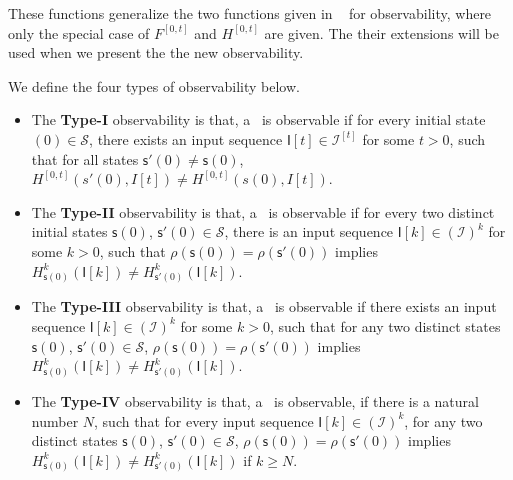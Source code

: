 These functions generalize the two functions given in ~\cite{Zhang2016Observability} for observability,  where only the special case of $F^{[0,t]}$ and $H^{[0,t]}$ are given. The their extensions  will be used when we present the the new observability.
\begin{definition} 
We define the four types of observability below. 
\begin{itemize}
  \item The {\bf Type-I} observability is that, a \BCN\ is observable if for every initial state \State$(0)\in \mathcal{S}$, there exists an input sequence $\mathsf{I}[t]\in\mathcal{I}^{[t]}$ for some $t>0$, such that for all states $\mathsf{s}'(0)\neq \mathsf{s}(0)$,  $H^{[0,t]}(s'(0),I[t])\neq H^{[0,t]}(s(0), I[t])$.
  \item The  {\bf Type-II} observability is that, a \BCN\ is observable if for every two distinct initial states $\mathsf{s}(0)$, $\mathsf{s}'(0) \in \mathcal{S}$, there is an input sequence $\mathsf{I}[k]\in(\mathcal{I})^k$ for some $k>0$, such that $\rho(\mathsf{s}(0))=\rho(\mathsf{s}'(0))$ implies $H^k_{\mathsf{s}(0)}(\mathsf{I}[k])\neq H^k_{\mathsf{s}'(0)}(\mathsf{I}[k])$.
  \item The {\bf Type-III} observability is that, a \BCN\ is observable if there exists an input sequence $\mathsf{I}[k]\in(\mathcal{I})^k$ for some $k>0$, such that for any two distinct states $\mathsf{s}(0)$, $\mathsf{s}'(0) \in \mathcal{S}$, $\rho(\mathsf{s}(0))=\rho(\mathsf{s}'(0))$ implies $H^k_{\mathsf{s}(0)}(\mathsf{I}[k])\neq H^k_{\mathsf{s}'(0)}(\mathsf{I}[k])$.
  \item The {\bf Type-IV} observability is that, a \BCN\ is observable, if there is a  natural number $N$, such that for every input sequence $\mathsf{I}[k]\in(\mathcal{I})^{k}$, for any two distinct states $\mathsf{s}(0)$, $\mathsf{s}'(0) \in \mathcal{S}$, $\rho(\mathsf{s}(0))=\rho(\mathsf{s}'(0))$ implies $H^{k}_{\mathsf{s}(0)}(\mathsf{I}[k])\neq H^{k}_{\mathsf{s}'(0)}(\mathsf{I}[k])$ if  $k\ge N$.
\end{itemize} 
\end{definition}




